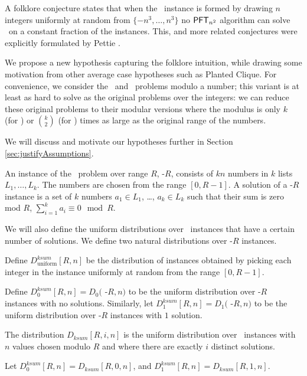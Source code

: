 A folklore conjecture states that when the \ThSum~instance is formed by drawing $n$ integers uniformly at random from $\{-n^3, \dots, n^3\}$ no $\mathsf{PFT}_{n^2}$ algorithm can solve \ThSum~on a constant fraction of the instances. 
This, and more related conjectures were explicitly formulated by Pettie \cite{avgCase3Sum}. 

We propose a new hypothesis capturing the folklore intuition, while drawing some motivation from other average case hypotheses such as Planted Clique. For convenience, we consider the \kSum~and \zkclique~problems modulo a number;
this variant is at least as hard to solve as the original problems over the integers: we can reduce these original problems to their modular versions where the modulus is only $k$ (for \kSum) or $\binom k 2$ (for \zkclique) times as large as the original range of the numbers.

We will discuss and motivate our hypotheses further in Section \ref{sec:justifyAssumptions}.

\begin{definition}
	An instance of the \kSum~problem over range $R$, \kSum-$R$, consists of $kn$ numbers in $k$ lists $L_1, \ldots, L_k$. The numbers are chosen from the range $[0,R-1]$. 
	A solution of a \kSum-$R$ instance is a set of $k$ numbers $a_1 \in L_1$, \ldots, $a_k \in L_k$ such that their sum is zero mod $R$, $\sum_{i=1}^k a_i \equiv 0 \mod R$. 
\end{definition}

We will also define the uniform distributions over \kSum~instances that have a certain number of solutions. 
We define two natural distributions over \kSum-$R$ instances.

\begin{definition}
Define $D^{ksum}_{\textrm{uniform}}[R,n]$ be the distribution of instances obtained by picking each integer in the instance uniformly at random from the range $[0,R-1]$.

Define $D^{ksum}_{0}[R,n] = D_0($ \kSum-$R, n)$ to be the uniform distribution over \kSum-$R$ instances with no solutions. Similarly, let $D^{ksum}_{1}[R,n] = D_1($ \kSum-$R, n)$ to be the uniform distribution over \kSum-$R$ instances with $1$ solution.

The distribution $D_{ksum}[R,i,n]$ is the uniform distribution over \kSum~instances with $n$ values chosen modulo $R$ and where there are exactly $i$ distinct solutions. 

Let $D^{ksum}_{0}[R,n] = D_{ksum}[R, 0, n]$, and $D^{ksum}_{1}[R,n] = D_{ksum}[R, 1, n]$.
\end{definition}


